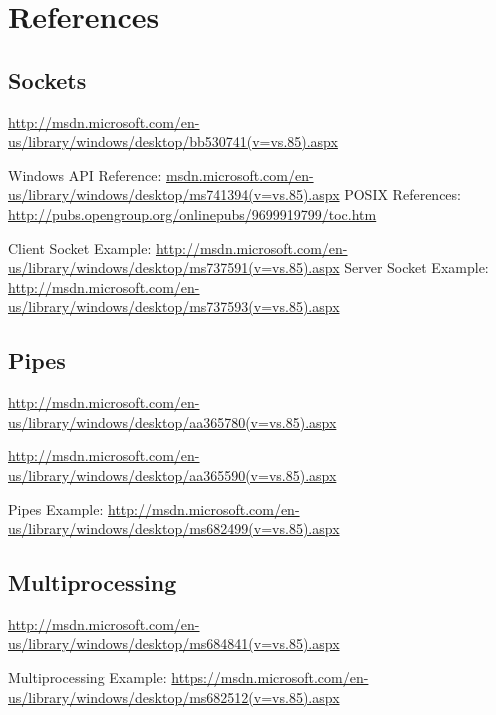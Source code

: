 \documentclass[letterpaper,10pt]{article}
\begin{document}
\section{References}

\subsection{Sockets}
\url{http://msdn.microsoft.com/en-us/library/windows/desktop/bb530741(v=vs.85).aspx}

Windows API Reference: \url{msdn.microsoft.com/en-us/library/windows/desktop/ms741394(v=vs.85).aspx}
POSIX References: \url{http://pubs.opengroup.org/onlinepubs/9699919799/toc.htm}

Client Socket Example: \url{http://msdn.microsoft.com/en-us/library/windows/desktop/ms737591(v=vs.85).aspx}
Server Socket Example: \url{http://msdn.microsoft.com/en-us/library/windows/desktop/ms737593(v=vs.85).aspx}

\subsection{Pipes}
\url{http://msdn.microsoft.com/en-us/library/windows/desktop/aa365780(v=vs.85).aspx}

\url{http://msdn.microsoft.com/en-us/library/windows/desktop/aa365590(v=vs.85).aspx}

Pipes Example: \url{http://msdn.microsoft.com/en-us/library/windows/desktop/ms682499(v=vs.85).aspx}

\subsection{Multiprocessing}
\url{http://msdn.microsoft.com/en-us/library/windows/desktop/ms684841(v=vs.85).aspx}

Multiprocessing Example: \url{https://msdn.microsoft.com/en-us/library/windows/desktop/ms682512(v=vs.85).aspx}
\end{document}
